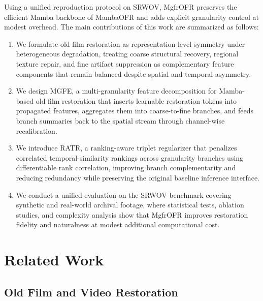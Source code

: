 Using a unified reproduction protocol on SRWOV, MgfrOFR preserves the efficient Mamba backbone of MambaOFR and adds explicit granularity control at modest overhead. The main contributions of this work are summarized as follows:
\begin{enumerate}
    \item We formulate old film restoration as representation-level symmetry under heterogeneous degradation, treating coarse structural recovery, regional texture repair, and fine artifact suppression as complementary feature components that remain balanced despite spatial and temporal asymmetry.
    \item We design MGFE, a multi-granularity feature decomposition for Mamba-based old film restoration that inserts learnable restoration tokens into propagated features, aggregates them into coarse-to-fine branches, and feeds branch summaries back to the spatial stream through channel-wise recalibration.
    \item We introduce RATR, a ranking-aware triplet regularizer that penalizes correlated temporal-similarity rankings across granularity branches using differentiable rank correlation, improving branch complementarity and reducing redundancy while preserving the original baseline inference interface.
    \item We conduct a unified evaluation on the SRWOV benchmark covering synthetic and real-world archival footage, where statistical tests, ablation studies, and complexity analysis show that MgfrOFR improves restoration fidelity and naturalness at modest additional computational cost.
\end{enumerate}
\section{Related Work}
\label{sec:related}

\subsection{Old Film and Video Restoration}
\label{subsec:ofr}

